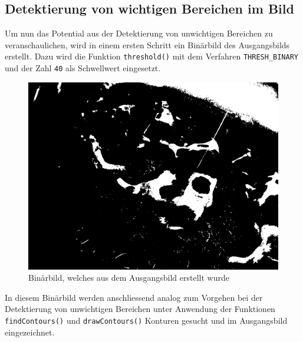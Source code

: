\subsection{Detektierung von wichtigen Bereichen im Bild}

Um nun das Potential aus der Detektierung von unwichtigen Bereichen zu veranschaulichen, wird in einem ersten Schritt ein Binärbild des Ausgangsbilds erstellt. Dazu wird die Funktion \texttt{threshold()} mit dem Verfahren \texttt{THRESH_BINARY} und der Zahl \texttt{40} als Schwellwert eingesetzt.

\begin{figure}[H]
	\center
	\includegraphics[scale=0.43]{Grafiken/entwicklung/8thresholdedMask.jpg}
	\caption{Binärbild, welches aus dem Ausgangsbild erstellt wurde} 
	\label{fig: Binärbild, welches aus dem Ausgangsbild erstellt wurde}
\end{figure}

In diesem Binärbild werden anschliessend analog zum Vorgehen bei der Detektierung von unwichtigen Bereichen unter Anwendung der Funktionen \texttt{findContours()} und \texttt{drawContours()} Konturen gesucht und im Ausgangsbild eingezeichnet.


